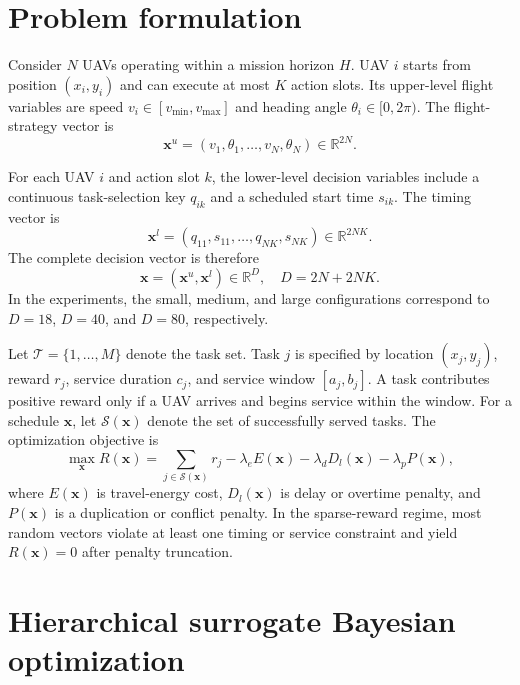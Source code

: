 \documentclass[twocolumn]{article}
\newcommand{\R}{\mathbb{R}}
\newcommand{\vect}[1]{\bm{#1}}
\begin{document}
\section{Problem formulation}
Consider $N$ UAVs operating within a mission horizon $H$. UAV $i$ starts from position $(x_i,y_i)$ and can execute at most $K$ action slots. Its upper-level flight variables are speed $v_i\in[v_{\min},v_{\max}]$ and heading angle $\theta_i\in[0,2\pi)$. The flight-strategy vector is
\begin{equation}
    \vect{x}^{u}= (v_1,\theta_1,\ldots,v_N,\theta_N)\in\R^{2N}.
\end{equation}

For each UAV $i$ and action slot $k$, the lower-level decision variables include a continuous task-selection key $q_{ik}$ and a scheduled start time $s_{ik}$. The timing vector is
\begin{equation}
    \vect{x}^{l}= (q_{11},s_{11},\ldots,q_{NK},s_{NK})\in\R^{2NK}.
\end{equation}
The complete decision vector is therefore
\begin{equation}
    \vect{x}=(\vect{x}^{u},\vect{x}^{l})\in\R^{D}, \quad D=2N+2NK.
\end{equation}
In the experiments, the small, medium, and large configurations correspond to $D=18$, $D=40$, and $D=80$, respectively.

Let $\mathcal{T}=\{1,\ldots,M\}$ denote the task set. Task $j$ is specified by location $(x_j,y_j)$, reward $r_j$, service duration $c_j$, and service window $[a_j,b_j]$. A task contributes positive reward only if a UAV arrives and begins service within the window. For a schedule $\vect{x}$, let $\mathcal{S}(\vect{x})$ denote the set of successfully served tasks. The optimization objective is
\begin{equation}
    \max_{\vect{x}} R(\vect{x})=\sum_{j\in\mathcal{S}(\vect{x})}r_j-\lambda_eE(\vect{x})-
    \lambda_dD_l(\vect{x})-\lambda_pP(\vect{x}),
\end{equation}
where $E(\vect{x})$ is travel-energy cost, $D_l(\vect{x})$ is delay or overtime penalty, and $P(\vect{x})$ is a duplication or conflict penalty. In the sparse-reward regime, most random vectors violate at least one timing or service constraint and yield $R(\vect{x})=0$ after penalty truncation.

\section{Hierarchical surrogate Bayesian optimization}
\end{document}
